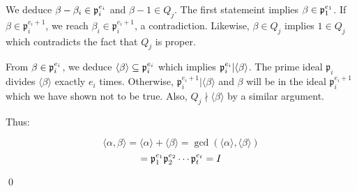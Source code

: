 \documentclass{article}
\newcommand{\<}{{{
    \langle
}}}
\def\>{{{
    \rangle
}}}
\newcommand{\pideal}{
    {{\mathfrak{p}}}
}
\begin{document}
We deduce 
$\beta - \beta_i \in \ppow{e}{i}$ and $\beta - 1 \in Q_j$. 
The first statemeint implies $\beta \in \ppow{e}{1}$. If 
$\beta \in \pideal_i^{e_i+1}$, we reach $\beta_i \in \pideal_i^{e_i+1}$, 
a contradiction. Likewise, $\beta \in Q_j$ implies $1 \in Q_j$ 
which contradicts the fact that $Q_j$ is proper. 

From $\beta \in \ppow{e}{i}$, we deduce $\<\beta\> \subseteq \ppow{e}{i}$ 
which implies $\ppow{e}{i}| \<\beta\>$. The prime ideal $\pideal_i$ 
divides $\<\beta\>$ exactly $e_i$ times. Otherwise, $\pideal_i^{e_i+1} | \<\beta\>$
and $\beta$ will be in the ideal  $\pideal_i^{e_i+1}$ which we have shown 
not to be true. Also, $Q_j \nmid \<\beta\>$ by a similar argument. 

Thus:

\[
    \<\alpha, \beta\> = \<\alpha\> + \<\beta\> 
    = \gcd(\<\alpha\>, \<\beta\>)
\]
\[
    = \ppow{e}{1} \ppow{e}{2} \cdots \ppow{e}{t} = I 
\]

\qed
\end{document}
